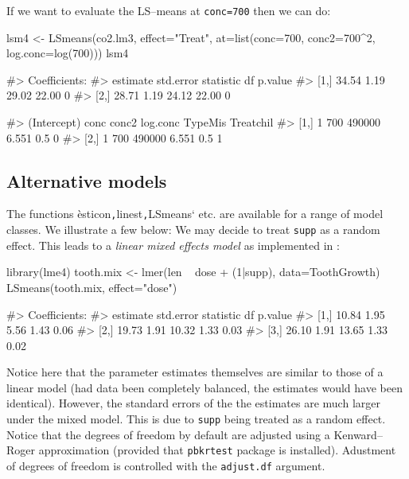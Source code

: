 If we want to evaluate the LS--means at \texttt{conc=700} then we can
do:

\begin{Schunk}
\begin{Sinput}
lsm4 <- LSmeans(co2.lm3, effect="Treat", at=list(conc=700, conc2=700^2, log.conc=log(700)))
lsm4
\end{Sinput}
\begin{Soutput}
#> Coefficients:
#>      estimate std.error statistic    df p.value
#> [1,]    34.54      1.19     29.02 22.00       0
#> [2,]    28.71      1.19     24.12 22.00       0
\end{Soutput}
\begin{Soutput}
#>      (Intercept) conc  conc2 log.conc TypeMis Treatchil
#> [1,]           1  700 490000    6.551     0.5         0
#> [2,]           1  700 490000    6.551     0.5         1
\end{Soutput}
\end{Schunk}

\hypertarget{alternative-models}{%
\subsection{Alternative models}\label{alternative-models}}

The functions èsticon\texttt{,}linest\texttt{,}LSmeans` etc. are
available for a range of model classes. We illustrate a few below: We
may decide to treat \verb|supp| as a random effect. This leads to a
\emph{linear mixed effects model} as implemented in \citet{lme4}:

\begin{Schunk}
\begin{Sinput}
library(lme4)
tooth.mix <- lmer(len ~ dose + (1|supp), data=ToothGrowth)
LSmeans(tooth.mix, effect="dose")
\end{Sinput}
\begin{Soutput}
#> Coefficients:
#>      estimate std.error statistic    df p.value
#> [1,]    10.84      1.95      5.56  1.43    0.06
#> [2,]    19.73      1.91     10.32  1.33    0.03
#> [3,]    26.10      1.91     13.65  1.33    0.02
\end{Soutput}
\end{Schunk}

Notice here that the parameter estimates themselves are similar to those
of a linear model (had data been completely balanced, the estimates
would have been identical). However, the standard errors of the the
estimates are much larger under the mixed model. This is due to
\texttt{supp} being treated as a random effect. Notice that the degrees
of freedom by default are adjusted using a Kenward--Roger approximation
(provided that \texttt{pbkrtest} package \citep{pbkrtest} is installed).
Adustment of degrees of freedom is controlled with the
\texttt{adjust.df} argument.

